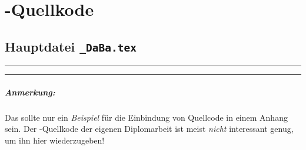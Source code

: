 \chapter{\latex-Quellkode}
\label{app:latex}

\section*{Hauptdatei {\tt\_DaBa.tex}}

\begin{footnotesize}

\end{footnotesize}


\hrule
\hrule

\paragraph{Anmerkung:}
Das sollte nur ein \emph{Beispiel} für die Einbindung von Quellcode
in einem Anhang sein. Der \latex-Quellkode der eigenen
Diplomarbeit ist meist \emph{nicht} interessant genug, um ihn hier
wiederzugeben!

